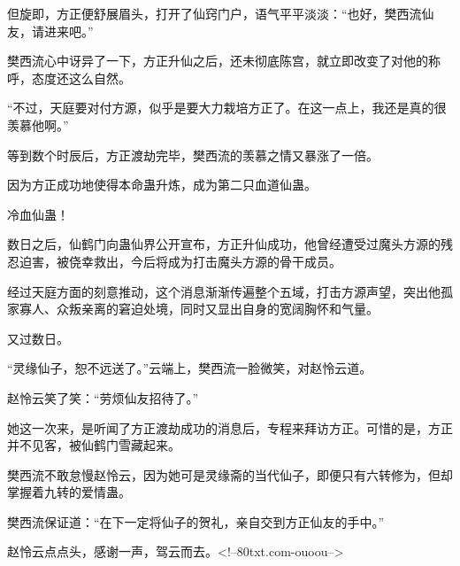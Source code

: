 \begin{this_body}
但旋即，方正便舒展眉头，打开了仙窍门户，语气平平淡淡：“也好，樊西流仙友，请进来吧。”

樊西流心中讶异了一下，方正升仙之后，还未彻底陈宫，就立即改变了对他的称呼，态度还这么自然。

“不过，天庭要对付方源，似乎是要大力栽培方正了。在这一点上，我还是真的很羡慕他啊。”

等到数个时辰后，方正渡劫完毕，樊西流的羡慕之情又暴涨了一倍。

因为方正成功地使得本命蛊升炼，成为第二只血道仙蛊。

冷血仙蛊！

数日之后，仙鹤门向蛊仙界公开宣布，方正升仙成功，他曾经遭受过魔头方源的残忍迫害，被侥幸救出，今后将成为打击魔头方源的骨干成员。

经过天庭方面的刻意推动，这个消息渐渐传遍整个五域，打击方源声望，突出他孤家寡人、众叛亲离的窘迫处境，同时又显出自身的宽阔胸怀和气量。

又过数日。

“灵缘仙子，恕不远送了。”云端上，樊西流一脸微笑，对赵怜云道。

赵怜云笑了笑：“劳烦仙友招待了。”

她这一次来，是听闻了方正渡劫成功的消息后，专程来拜访方正。可惜的是，方正并不见客，被仙鹤门雪藏起来。

樊西流不敢怠慢赵怜云，因为她可是灵缘斋的当代仙子，即便只有六转修为，但却掌握着九转的爱情蛊。

樊西流保证道：“在下一定将仙子的贺礼，亲自交到方正仙友的手中。”

赵怜云点点头，感谢一声，驾云而去。<!--80txt.com-ouoou-->

\end{this_body}

